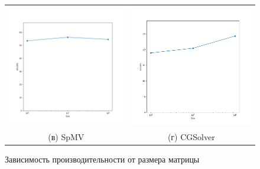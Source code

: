 \documentclass[12pt, a4paper]{article}
\begin{document}
\begin{figure}[H]
\begin{tabular}{cc}
		\includegraphics[width=85mm]{2025/cuda_spmv} & \includegraphics[width=85mm]{2025/cuda_cgsolver} \\
		(в) SpMV & (г) CGSolver \\[6pt]
	\end{tabular}
	\caption{Зависимость производительности от размера матрицы}
	\label{fig:cuda_flops_polus} 
\end{figure}
\end{document}

